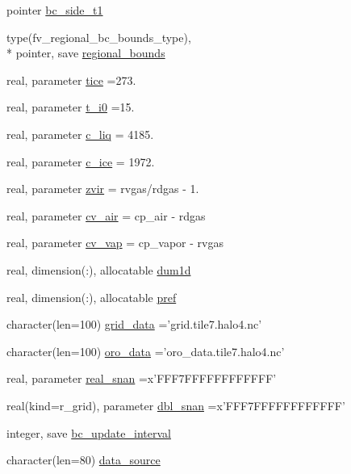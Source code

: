 \begin{DoxyCompactItemize}
pointer \hyperlink{classfv__regional__mod_a8ffee600e05a0988addd6e7387fe9547}{bc\-\_\-side\-\_\-t1}
\item 
type(fv\-\_\-regional\-\_\-bc\-\_\-bounds\-\_\-type), \\*
pointer, save \hyperlink{classfv__regional__mod_a13909d8a60906605379b221f840ea3c1}{regional\-\_\-bounds}
\item 
real, parameter \hyperlink{classfv__regional__mod_a234b3fd9ee427db8de0880bc4f5849c9}{tice} =273.
\item 
real, parameter \hyperlink{classfv__regional__mod_ab891456d653e8b3dba04c9a553877b22}{t\-\_\-i0} =15.
\item 
real, parameter \hyperlink{classfv__regional__mod_a7c984c269922724e4ec90ab8e39c3497}{c\-\_\-liq} = 4185.
\item 
real, parameter \hyperlink{classfv__regional__mod_a2d3e253e8cfeeb07d467f80cc3e02db6}{c\-\_\-ice} = 1972.
\item 
real, parameter \hyperlink{classfv__regional__mod_a8ac5940c29c15b1a91d7ee8e80e826bc}{zvir} = rvgas/rdgas -\/ 1.
\item 
real, parameter \hyperlink{classfv__regional__mod_ac7ad42fc025310b9621b50b2fd978b12}{cv\-\_\-air} = cp\-\_\-air -\/ rdgas
\item 
real, parameter \hyperlink{classfv__regional__mod_af441421c2c1bc6465e3552693aed3a0f}{cv\-\_\-vap} = cp\-\_\-vapor -\/ rvgas
\item 
real, dimension(\-:), allocatable \hyperlink{classfv__regional__mod_a5616e5b4b06f6c406824fa679fa0fd9e}{dum1d}
\item 
real, dimension(\-:), allocatable \hyperlink{classfv__regional__mod_ac942190aa433f5ffa8901ccf140b1663}{pref}
\item 
character(len=100) \hyperlink{classfv__regional__mod_af44c16e69ea0e0f34f3fd45b9bdb7380}{grid\-\_\-data} ='grid.\-tile7.\-halo4.\-nc'
\item 
character(len=100) \hyperlink{classfv__regional__mod_a97454c0d7b19a08bc2bd65c06cc75fcb}{oro\-\_\-data} ='oro\-\_\-data.\-tile7.\-halo4.\-nc'
\item 
real, parameter \hyperlink{classfv__regional__mod_a0caa164db78f0352f7124e34227e9950}{real\-\_\-snan} =x'F\-F\-F7\-F\-F\-F\-F\-F\-F\-F\-F\-F\-F\-F\-F'
\item 
real(kind=r\-\_\-grid), parameter \hyperlink{classfv__regional__mod_afb97c724dfbe30f087907a7a7f1eaf44}{dbl\-\_\-snan} =x'F\-F\-F7\-F\-F\-F\-F\-F\-F\-F\-F\-F\-F\-F\-F'
\item 
integer, save \hyperlink{classfv__regional__mod_aa8a82e411bb80aa539a1f5ff6436fdc1}{bc\-\_\-update\-\_\-interval}
\item 
character(len=80) \hyperlink{classfv__regional__mod_a390d0696d4ec8ca340b2fc69213e16e8}{data\-\_\-source}
\end{DoxyCompactItemize}


